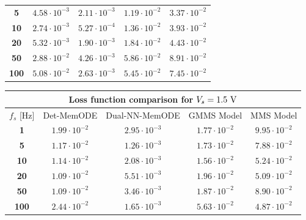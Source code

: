 \documentclass[11pt, oneside]{article}
\begin{document}
\begin{table}
\begin{tabular}{c|cccc}
        \textbf{5}   & \(4.58 \cdot 10^{-3}\) & \color{ieeegreen} \bfseries \(2.11 \cdot 10^{-3}\) & \(1.19 \cdot 10^{-2}\) & \color{ieeered} \bfseries \(3.37 \cdot 10^{-2}\) \\
        \textbf{10}  & \(2.74 \cdot 10^{-3}\) & \color{ieeegreen} \bfseries \(5.27 \cdot 10^{-4}\) & \(1.36 \cdot 10^{-2}\) & \color{ieeered} \bfseries \(3.93 \cdot 10^{-2}\) \\
        \textbf{20}  & \(5.32 \cdot 10^{-3}\) & \color{ieeegreen} \bfseries \(1.90 \cdot 10^{-3}\) & \(1.84 \cdot 10^{-2}\) & \color{ieeered} \bfseries \(4.43 \cdot 10^{-2}\) \\
        \textbf{50}  & \(2.88 \cdot 10^{-2}\) & \color{ieeegreen} \bfseries \(4.26 \cdot 10^{-3}\) & \(5.86 \cdot 10^{-2}\) & \color{ieeered} \bfseries \(8.91 \cdot 10^{-2}\) \\
        \textbf{100} & \(5.08 \cdot 10^{-2}\) & \color{ieeegreen} \bfseries \(2.63 \cdot 10^{-3}\) & \(5.45 \cdot 10^{-2}\) & \color{ieeered} \bfseries \(7.45 \cdot 10^{-2}\) \\
        \bottomrule
    \end{tabular}
    \begin{tabular}{c|cccc}
        \toprule
        \multicolumn{5}{c}{\textbf{Loss function comparison for \(V_s = 1.5 \rm \ V\)}}                                                                                                            \\
        \midrule
        \(f_s\) [Hz]   & Det-MemODE           & Dual-NN-MemODE                                   & GMMS Model                                     & MMS Model                                      \\
        \midrule
        \textbf{1}   & \(1.99 \cdot 10^{-2}\) & \color{ieeegreen} \bfseries \(2.95 \cdot 10^{-3}\) & \(1.77 \cdot 10^{-2}\)                           & \color{ieeered} \bfseries \(9.95 \cdot 10^{-2}\) \\
        \textbf{5}   & \(1.17 \cdot 10^{-2}\) & \color{ieeegreen} \bfseries \(1.26 \cdot 10^{-3}\) & \(1.73 \cdot 10^{-2}\)                           & \color{ieeered} \bfseries \(7.88 \cdot 10^{-2}\) \\
        \textbf{10}  & \(1.14 \cdot 10^{-2}\) & \color{ieeegreen} \bfseries \(2.08 \cdot 10^{-3}\) & \(1.56 \cdot 10^{-2}\)                           & \color{ieeered} \bfseries \(5.24 \cdot 10^{-2}\) \\
        \textbf{20}  & \(1.09 \cdot 10^{-2}\) & \color{ieeegreen} \bfseries \(5.51 \cdot 10^{-3}\) & \(1.96 \cdot 10^{-2}\)                           & \color{ieeered} \bfseries \(5.09 \cdot 10^{-2}\) \\
        \textbf{50}  & \(1.09 \cdot 10^{-2}\) & \color{ieeegreen} \bfseries \(3.46 \cdot 10^{-3}\) & \(1.87 \cdot 10^{-2}\)                           & \color{ieeered} \bfseries \(8.90 \cdot 10^{-2}\) \\
        \textbf{100} & \(2.44 \cdot 10^{-2}\) & \color{ieeegreen} \(1.65 \cdot 10^{-3}\)           & \color{ieeered} \bfseries \(5.63 \cdot 10^{-2}\) & \(4.87 \cdot 10^{-2}\)                           \\
        \bottomrule
    \end{tabular}


\end{table}
\end{document}
